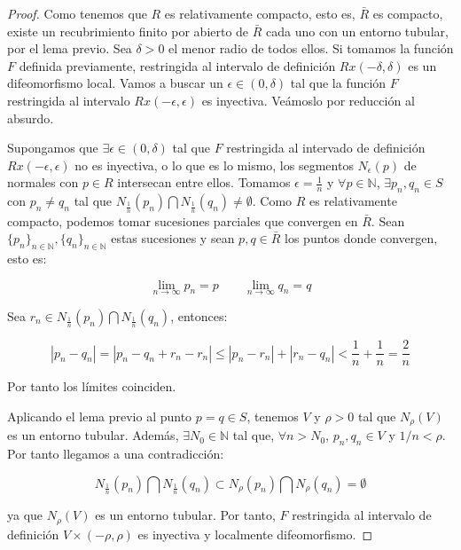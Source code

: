 \documentclass[paper=a4, fontsize=11pt, spanish]{scrartcl}
\theoremstyle{definition}
\theoremstyle{definition}
\theoremstyle{definition}
\begin{document}
\begin{proof}
Como tenemos que $R$ es relativamente compacto, esto es, $\bar{R}$ es compacto, existe un recubrimiento finito por abierto de $\bar{R}$ cada uno con un entorno tubular, por el lema previo. Sea $\delta > 0$ el menor radio de todos ellos. Si tomamos la función $F$ definida previamente, restringida al intervalo de definición $Rx(-\delta, \delta)$ es un difeomorfismo local. Vamos a buscar un $\epsilon \in (0,\delta)$ tal que la función $F$ restringida al intervalo $Rx(-\epsilon, \epsilon)$ es inyectiva. Veámoslo por reducción al absurdo.

Supongamos que $\exists \epsilon \in (0,\delta)$ tal que $F$ restringida al intervado de definición $Rx(-\epsilon, \epsilon)$ no es inyectiva, o lo que es lo mismo, los segmentos $N_\epsilon(p)$ de normales con $p \in R$ intersecan entre ellos. Tomamos $\epsilon=\frac{1}{n}$ y $\forall p \in \mathbb{N}$, $\exists p_n,q_n \in S$ con $p_n \neq q_n$ tal que $N_{\frac{1}{n}}(p_n) \bigcap N_{\frac{1}{n}}(q_n) \neq \emptyset$.
Como $R$ es relativamente compacto, podemos tomar sucesiones parciales que convergen en $\bar{R}$. Sean $\{p_n\}_{n \in \mathbb{N}}, \{q_n\}_{n \in \mathbb{N}}$ estas sucesiones y sean $p,q \in \bar{R}$ los puntos donde convergen, esto es:

\begin{equation*}
    \lim_{n\to\infty} p_n = p \qquad \lim_{n\to\infty} q_n = q
\end{equation*}

Sea $r_n \in N_{\frac{1}{n}}(p_n) \bigcap N_{\frac{1}{n}}(q_n)$, entonces:

\begin{equation*}
    |p_n - q_n| = |p_n - q_n + r_n - r_n| \leq |p_n-r_n| + |r_n-q_n| < \frac{1}{n}+\frac{1}{n} = \frac{2}{n}
\end{equation*}

Por tanto los límites coinciden.

Aplicando el lema previo al punto $p = q \in S$, tenemos $V$ y $\rho > 0$ tal que $N_\rho(V)$ es un entorno tubular. Además, $\exists N_0 \in \mathbb{N}$ tal que, $\forall n > N_0$, $p_n,q_n \in V$ y $1/n < \rho$. Por tanto llegamos a una contradicción:

\begin{equation*}
    N_{\frac{1}{n}}(p_n) \bigcap N_{\frac{1}{n}}(q_n) \subset N_\rho(p_n)\bigcap N_\rho(q_n) = \emptyset
\end{equation*}

ya que $N_\rho(V)$ es un entorno tubular. Por tanto, $F$ restringida al intervalo de definición $V \times (-\rho, \rho)$ es inyectiva y localmente difeomorfismo.

\end{proof}
\end{document}
